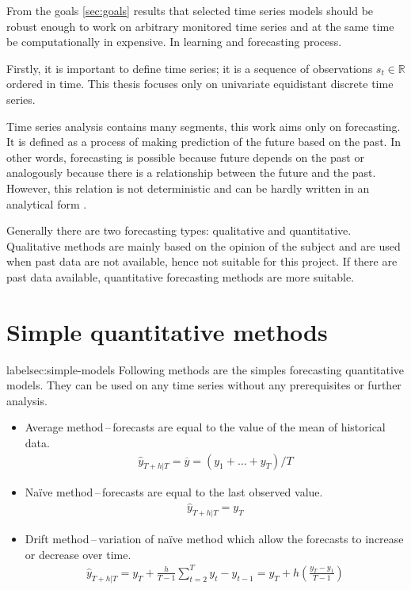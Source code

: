 From the goals \ref{sec:goals} results that selected time series models should be robust enough to work on arbitrary
monitored time series and at the same time be computationally in expensive. In learning and forecasting process.

Firstly, it is important to define time series; it is a sequence of observations $s_t \in \mathbb{R}$ ordered in time.
This thesis focuses only on univariate equidistant discrete time series.

Time series analysis contains many segments, this work aims only on forecasting. It is defined as a process of making
prediction of the future based on the past. In other words, forecasting is possible because future depends on the
past or analogously because there is a relationship between the future and the past. However, this relation is not
deterministic and can be hardly written in an analytical form \cite{otexts}.

Generally there are two forecasting types: qualitative and quantitative. Qualitative methods are mainly based on the
opinion of the subject and are used when past data are not available, hence not suitable for this project. If there
are past data available, quantitative forecasting methods are more suitable.

    \section{Simple quantitative methods} label{sec:simple-models}
    Following methods are the simples forecasting quantitative models. They can be used on any time series without
    any prerequisites or further analysis.

    \begin{itemize}
        \item Average method\,--\,forecasts are equal to the value of the mean of historical data.
            \begin{eqnarray}
                \hat{y}_{T+h|T} = \overline{y} = (y_{1}+ \dots + y_{T}) / T 
            \end{eqnarray}
        \item Na\"{i}ve method\,--\,forecasts are equal to the last observed value.
            \begin{eqnarray}
                \hat{y}_{T+h|T} = y_{T}
            \end{eqnarray}
        \item Drift method\,--\,variation of na\"{i}ve method which allow the forecasts to increase or decrease
            over time.
            \begin{eqnarray}
                \hat{y}_{T+h|T} = y_{T} + \frac{h}{T-1} \sum_{t=2}^T{y_{t} - y_{t-1}} = 
                    y_{T} + h(\frac{y_{T}-y_{1}}{T-1}) 
            \end{eqnarray}
    \end{itemize}

